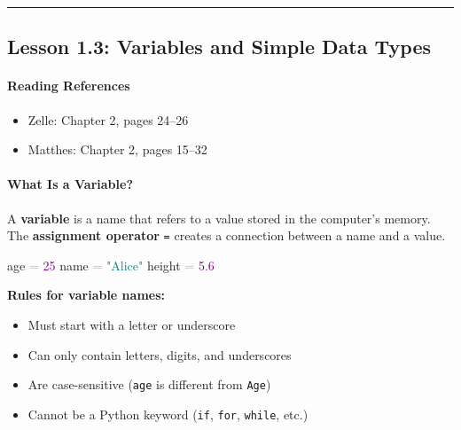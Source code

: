 \documentclass[
  justified,
  openright,
]{tufte-book}
\let\subsubsection\paragraph
\let\paragraph\paragraph
\newcommand{\DecValTok}[1]{\textcolor{Purple}{#1}}
\newcommand{\FloatTok}[1]{\textcolor{Purple}{#1}}
\newcommand{\NormalTok}[1]{#1}
\newcommand{\OperatorTok}[1]{\textcolor{DarkGray}{#1}}
\newcommand{\StringTok}[1]{\textcolor{Teal}{#1}}
\newenvironment{Shaded}{%
  \begin{snugshade}
}{%
  \end{snugshade}
}
\let\subsubsection\paragraph
\let\paragraph\paragraph
\providecommand{\tightlist}{%
  \setlength{\itemsep}{0pt}\setlength{\parskip}{0pt}}
\begin{document}
\begin{center}\rule{0.5\linewidth}{0.5pt}\end{center}

\subsection{Lesson 1.3: Variables and Simple Data
Types}\label{lesson-1.3-variables-and-simple-data-types-1}

\subsubsection{Reading References}\label{reading-references-6}

\begin{itemize}
\tightlist
\item
  Zelle: Chapter 2, pages 24--26
\item
  Matthes: Chapter 2, pages 15--32
\end{itemize}

\subsubsection{What Is a Variable?}\label{what-is-a-variable}

A \textbf{variable} is a name that refers to a value stored in the
computer's memory. The \textbf{assignment operator} \texttt{=} creates a
connection between a name and a value.

\begin{Shaded}
\begin{Highlighting}[]
\NormalTok{age }\OperatorTok{=} \DecValTok{25}
\NormalTok{name }\OperatorTok{=} \StringTok{"Alice"}
\NormalTok{height }\OperatorTok{=} \FloatTok{5.6}
\end{Highlighting}
\end{Shaded}

\textbf{Rules for variable names:}

\begin{itemize}
\tightlist
\item
  Must start with a letter or underscore
\item
  Can only contain letters, digits, and underscores
\item
  Are case-sensitive (\texttt{age} is different from \texttt{Age})
\item
  Cannot be a Python keyword (\texttt{if}, \texttt{for}, \texttt{while},
  etc.)
\end{itemize}
\end{document}
